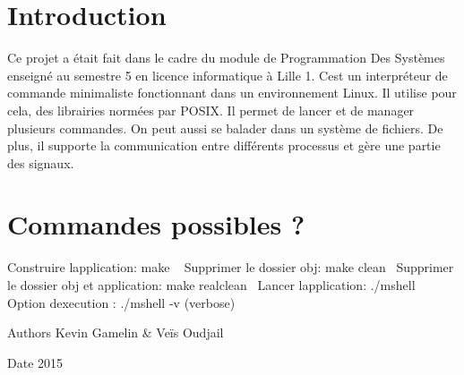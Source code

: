 \hypertarget{index_intro_sec}{}\section{Introduction}\label{index_intro_sec}
Ce projet a était fait dans le cadre du module de Programmation Des Systèmes enseigné au semestre 5 en licence informatique à Lille 1. C\textquotesingle{}est un interpréteur de commande minimaliste fonctionnant dans un environnement Linux. Il utilise pour cela, des librairies normées par P\+O\+S\+I\+X. Il permet de lancer et de manager plusieurs commandes. On peut aussi se balader dans un système de fichiers. De plus, il supporte la communication entre différents processus et gère une partie des signaux.\hypertarget{index_install_sec}{}\section{Commandes possibles ?}\label{index_install_sec}
Construire l\textquotesingle{}application\+: make ~\newline
 Supprimer le dossier obj\+: make clean~\newline
 Supprimer le dossier obj et \textquotesingle{}application\+: make realclean~\newline
 Lancer l\textquotesingle{}application\+: ./mshell~\newline
 Option d\textquotesingle{}execution \+: ./mshell -\/v (verbose) ~\newline
 \begin{DoxyAuthor}{Authors}
Kevin Gamelin \& Veïs Oudjail 
\end{DoxyAuthor}
\begin{DoxyDate}{Date}
2015 
\end{DoxyDate}
